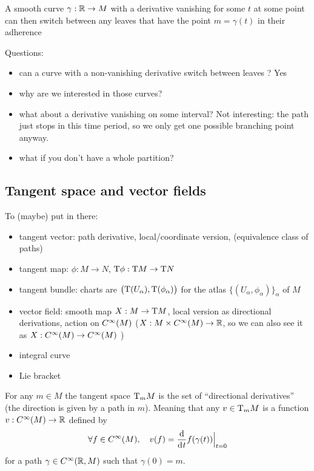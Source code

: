 	A smooth curve $\gamma: \mathbb{R} \to M$ with a derivative vanishing for some $t$ at some point can then switch between any leaves that have the point $m = \gamma(t)$ in their adherence

	Questions:
	\begin{itemize}
		\item can a curve with a non-vanishing derivative switch between leaves ? Yes
		\item why are we interested in those curves?
		\item what about a derivative vanishing on some interval? Not interesting: the path just stops in this time period, so we only get one possible branching point anyway.
		\item what if you don't have a whole partition?
	\end{itemize}


	\subsection{Tangent space and vector fields}

		To (maybe) put in there:
		\begin{itemize}
			\item tangent vector: path derivative, local/coordinate version, (equivalence class of paths)
			\item tangent map: $\phi: M \to N$, $\mathrm{T}{\phi}: \mathrm{T}{M} \to \mathrm{T}{N}$
			\item tangent bundle: charts are $\big( \mathrm{T}(U_\alpha), \mathrm{T}(\phi_\alpha) \big)$ for the atlas $\big\{ (U_\alpha, \phi_\alpha) \big\}_\alpha$ of $M$
			\item vector field: smooth map $X: M \to \mathrm{T}{M}$, local version as directional derivations, action on $C^\infty(M)$ ($X: M \times C^\infty(M) \to \mathbb{R}$, so we can also see it as $X: C^\infty(M) \to C^\infty(M)$ )
			\item integral curve
			\item Lie bracket
		\end{itemize}

		For any $m \in M$ the tangent space $\mathrm{T}_m{M}$ is the set of ``directional derivatives'' (the direction is given by a path in $m$).
		Meaning that any $v \in \mathrm{T}_m{M}$ is a function $v: C^\infty(M) \to \mathbb{R}$ defined by
		$$
			\forall f \in \Cinf(M), \quad v(f) = \frac{\d}{\di{t}} f(\gamma(t)) \Big|_{t=0}
		$$
		for a path $\gamma \in C^\infty(\mathbb{R}, M)$ such that $\gamma(0) = m$.

